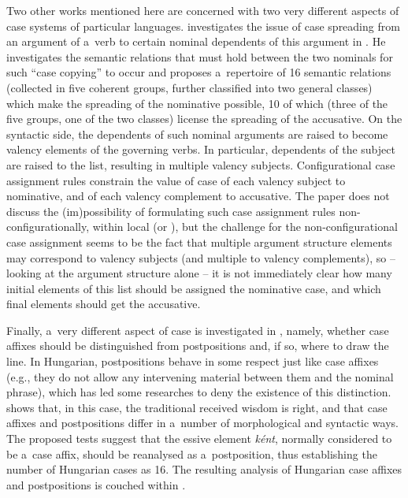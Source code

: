 \documentclass[output=paper
                ,modfonts
                ,nonflat
	        ,collection
	        ,collectionchapter
	        ,collectiontoclongg
 	        ,biblatex
                ,babelshorthands
                ,newtxmath
                ,draftmode
                ,colorlinks, citecolor=brown
]{./langsci/langscibook}
\begin{document}
\begin{exe}
\begin{xlist}
\begin{exe}
\begin{xlist}
Two other works mentioned here are concerned with two very different aspects of case systems of particular languages.  \citet{ryu:13} investigates the issue of case spreading from an argument of a~verb to certain nominal dependents of this argument in .  He investigates the semantic relations that must hold between the two nominals for such “case copying” to occur and proposes a~repertoire of 16 semantic relations (collected in five coherent groups, further classified into two general classes) which make the spreading of the nominative possible, 10 of which (three of the five groups, one of the two classes) license the spreading of the accusative.  On the syntactic side, the dependents of such nominal arguments are raised to become valency elements of the governing verbs.  In particular, dependents of the subject are raised to the  list, resulting in multiple valency subjects.  Configurational case assignment rules constrain the value of case of each valency subject to nominative, and of each valency complement to accusative.  The paper does not discuss the (im)possibility of formulating such case assignment rules non-configurationally, within local  (or ), but the challenge for the non-configurational case assignment seems to be the fact that multiple argument structure elements may correspond to valency subjects (and multiple to valency complements), so – looking at the argument structure alone – it is not immediately clear how many initial elements of this list should be assigned the nominative case, and which final elements should get the accusative.

Finally, a~very different aspect of  case is investigated in \citet{thui:11}, namely, whether case affixes should be distinguished from postpositions and, if so, where to draw the line.  In Hungarian, postpositions behave in some respect just like case affixes (e.g., they do not allow any intervening material between them and the nominal phrase), which has led some researches to deny the existence of this distinction.  \citet{thui:11} shows that, in this case, the traditional received wisdom is right, and that case affixes and postpositions differ in a~number of morphological and syntactic ways.  The proposed tests suggest that the essive element \emph{k{\'e}nt}, normally considered to be a~case affix, should be reanalysed as a~postposition, thus establishing the number of Hungarian cases as 16.  The resulting analysis of Hungarian case affixes and postpositions is couched within  \citep{BS2012a-ed}.


\end{xlist}
\end{exe}
\end{xlist}
\end{exe}
\end{document}
